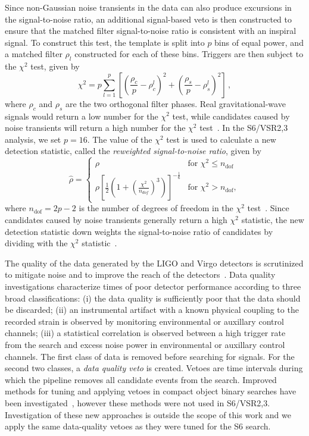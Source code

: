Since non-Gaussian noise transients in the data can also produce excursions in
the signal-to-noise ratio, an additional signal-based veto is then constructed
to ensure that the matched filter signal-to-noise ratio is
consistent with an inspiral signal. To construct this test, the
template is split into $p$ bins of equal power, and a matched filter $\rho_l$
constructed for each of these bins. Triggers are then subject to the
$\chi^2$ test, given by
%
\begin{equation}
\chi^2 = p\displaystyle\sum_{l=1}^{p}\left[\left(\frac{\rho_c}{p}-\rho_c^l\right)^2 + \left(\frac{\rho_s}{p}-\rho_s^l\right)^2 \right] \, ,
\label{eq:chisqr}
\end{equation}
%
where $\rho_c$ and $\rho_s$ are the two orthogonal filter phases.
Real gravitational-wave signals would return a low number for the $\chi^2$
test, while candidates caused by noise transients will
return a high number for the $\chi^2$ test~\cite{Allen:2004gu}. In the 
S6/VSR2,3 analysis, we set $p = 16$. The value of the $\chi^2$ test is used to 
calculate a new detection statistic, called the \emph{reweighted
signal-to-noise ratio}, given by 
%
\begin{equation}
\hat{\rho} =
  \begin{cases}
    \rho &\textrm{for } \chi^2 \leq n_\mathrm{dof}\\
    \rho[\frac{1}{2}(1+(\frac{\chi^2}{n_{dof}})^3)]^{-\frac{1}{6}} &\textrm{for } \chi^2 > n_\mathrm{dof} ,
  \end{cases}
\label{eq:newSNR}
\end{equation}
where $n_\mathrm{dof} = 2p-2$ is the number of degrees of freedom in the
$\chi^2$ test~\cite{Babak:2012zx}.
%
Since candidates caused by noise transients generally return a high $\chi^2$
statistic, the new detection statistic down weights the signal-to-noise ratio
of candidates by dividing with the $\chi^2$ statistic~\cite{Abadie:2011nz}.

The quality of the data generated by the LIGO and Virgo detectors is
scrutinized to mitigate noise and to improve the reach of the 
detectors~\cite{Aasi:2012wd,Aasi:2014mqd}. Data
quality investigations characterize times of poor detector performance
according to three broad classifications: (i) the data quality is sufficiently
poor that the data should be discarded; (ii) an instrumental artifact with a
known physical coupling to the recorded strain is observed by monitoring
environmental or auxillary control channels; (iii) a statistical correlation
is observed between a high trigger rate from the search and excess noise power
in environmental or auxillary control channels. The first class of data is
removed before searching for signals. For the second two classes, a \emph{data
quality veto} is created. Vetoes are time intervals during
which the pipeline removes all candidate events from the search.
Improved methods for tuning and applying vetoes in compact object binary
searches have been investigated~\cite{Canton:2013joa}, however these methods
were not used in S6/VSR2,3. Investigation of these new approaches is outside
the scope of this work and we apply the same data-quality vetoes as
they were tuned for the S6 search.

